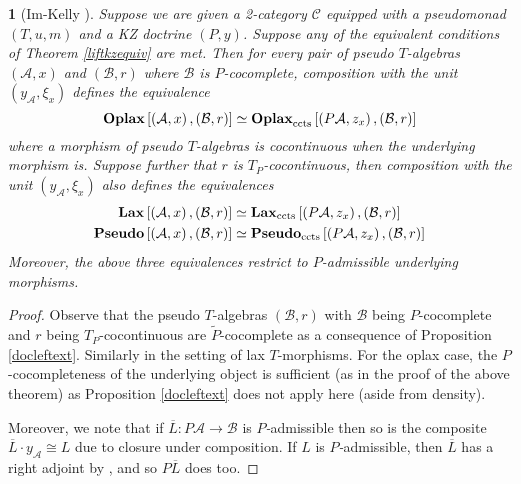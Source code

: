 \documentclass[a4paper,oneside,english]{amsart}
\numberwithin{equation}{section}
\numberwithin{figure}{section}
\theoremstyle{plain}
\theoremstyle{definition}
\theoremstyle{remark}
\theoremstyle{definition}
\theoremstyle{plain}
\theoremstyle{plain}
\newtheorem{cor}[thm]{\protect\corollaryname}
\theoremstyle{plain}
\providecommand{\corollaryname}{Corollary}
\begin{document}
\begin{cor}
[Im-Kelly \cite{uniconvolution}] Suppose we are given a 2-category
$\mathscr{C}$ equipped with a pseudomonad $\left(T,u,m\right)$ and
a KZ doctrine $\left(P,y\right)$. Suppose any of the equivalent conditions
of Theorem \ref{liftkzequiv} are met. Then for every pair of pseudo
$T$-algebras $\left(\mathcal{A},x\right)$ and $\left(\mathcal{B},r\right)$
where $\mathcal{B}$ is $P$-cocomplete, composition with the unit
$\left(y_{\mathcal{A}},\xi_{x}\right)$ defines the equivalence 
\[
\mathbf{Oplax}\left[\left(\mathcal{A},x\right),\left(\mathcal{B},r\right)\right]\simeq\mathbf{Oplax}_{\textnormal{ccts}}\left[\left(P\mathcal{A},z_{x}\right),\left(\mathcal{B},r\right)\right]
\]
where a morphism of pseudo $T$-algebras is cocontinuous when the
underlying morphism is. Suppose further that $r$ is $T_{P}$-cocontinuous,
then composition with the unit $\left(y_{\mathcal{A}},\xi_{x}\right)$
also defines the equivalences
\[
\begin{aligned}\mathbf{Lax}\left[\left(\mathcal{A},x\right),\left(\mathcal{B},r\right)\right] & \simeq\mathbf{Lax}_{\textnormal{ccts}}\left[\left(P\mathcal{A},z_{x}\right),\left(\mathcal{B},r\right)\right]\\
\mathbf{Pseudo}\left[\left(\mathcal{A},x\right),\left(\mathcal{B},r\right)\right] & \simeq\mathbf{Pseudo}_{\textnormal{ccts}}\left[\left(P\mathcal{A},z_{x}\right),\left(\mathcal{B},r\right)\right]
\end{aligned}
\]
Moreover, the above three equivalences restrict to \emph{$P$-}admissible
underlying morphisms.\end{cor}
\begin{proof}
Observe that the pseudo $T$-algebras $\left(\mathcal{B},r\right)$
with $\mathcal{B}$ being $P$-cocomplete and $r$ being $T_{P}$-cocontinuous
are $\widetilde{P}$-cocomplete as a consequence of Proposition \ref{docleftext}.
Similarly in the setting of lax $T$-morphisms. For the oplax case,
the $P$-cocompleteness of the underlying object is sufficient (as
in the proof of the above theorem) as Proposition \ref{docleftext}
does not apply here (aside from density).

Moreover, we note that if $\overline{L}\colon P\mathcal{A}\to\mathcal{B}$
is \emph{$P$-}admissible then so is the composite $\overline{L}\cdot y_{\mathcal{A}}\cong L$
due to closure under composition. If $L$ is \emph{$P$-}admissible,
then $\overline{L}$ has a right adjoint by \cite[Lemma 12]{yonedakz},
and so $P\overline{L}$ does too.\end{proof}
\end{document}
